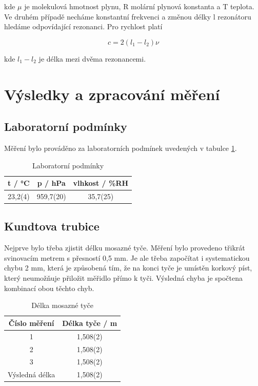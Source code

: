 kde \(\mu\) je molekulová hmotnost plynu, R molární plynová konstanta a T teplota.
Ve druhém případě necháme konstantní frekvenci a změnou délky l rezonátoru hledáme odpovídající rezonanci. Pro rychlost platí

\begin{equation}
    c = 2(l_1-l_2)\nu
\end{equation}

kde \(l_1-l_2\) je délka mezi dvěma rezonancemi.

\section{Výsledky a zpracování měření}

\subsection{Laboratorní podmínky}

    Měření bylo prováděno za laboratorních podmínek uvedených v tabulce \ref{tab:lab_pod}. 

    \begin{table}[h]
        \centering
        \caption{Laboratorní podmínky}
        \label{tab:lab_pod}
        \begin{tabular}{|c|c|c|} 
        \hline
            t / °C & p / hPa & vlhkost / \%RH  \\ 
        \hline
            23,2(4)   & 959,7(20)   & 35,7(25)            \\
        \hline
        \end{tabular}
    \end{table}

\subsection{Kundtova trubice}
Nejprve bylo třeba zjistit délku mosazné tyče. Měření bylo provedeno třikrát svinovacím metrem s přesností 0,5 mm. Je ale třeba započítat i systematickou chybu 2 mm, která je způsobená tím, že na konci tyče je umístěn korkový píst, který neumožňuje přiložit měřidlo přímo k tyči. Výsledná chyba je spočtena kombinací obou těchto chyb.

\begin{table}[h]
\centering
\caption{Délka mosazné tyče}
\label{tab:delka-tyce}
\begin{tabular}{|c|c|} 
\hline
Číslo měření   & Délka tyče / m  \\ 
\hline
1              & 1,508(2)        \\
2              & 1,508(2)        \\
3              & 1,508(2)        \\ 
\hline
Výsledná délka & 1,508(2)        \\
\hline
\end{tabular}
\end{table}

